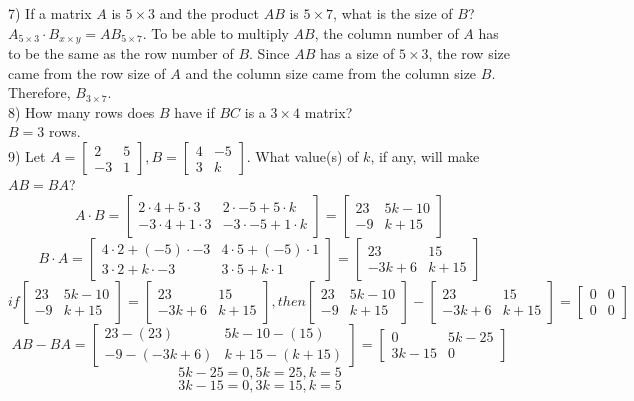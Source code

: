 \documentclass[a4paper]{article}
\begin{document}
7) If a matrix $A$ is $5\times3$ and the product $AB$ is $5\times7$, what is the size of $B$?\\
$A_{5\times3} \cdot B_{x \times y}=AB_{5\times7}$. To be able to multiply $AB$, the column number of $A$ has to be the same as the row number of $B$. Since $AB$ has a size of $5\times3$, the row size came from the row size of $A$ and the column size came from the column size $B$. Therefore, $B_{3\times7}$.\\

8) How many rows does $B$ have if $BC$ is a $3\times4$ matrix?\\
$B = 3$ rows.\\

9) Let $A = \begin{bmatrix}
2&5\\
-3&1
\end{bmatrix}, B = \begin{bmatrix}
4&-5\\
3&k
\end{bmatrix}$. What value(s) of $k$, if any, will make $AB = BA$?\\

\[A \cdot B=
\begin{bmatrix}
2\cdot4+5\cdot3&2\cdot-5+5\cdot k\\
-3\cdot4+1\cdot3&-3\cdot-5+1\cdot k
\end{bmatrix}=
\begin{bmatrix}
23&5k-10\\
-9&k+15
\end{bmatrix}
\]
\[B \cdot A=
\begin{bmatrix}
4\cdot2+(-5)\cdot-3&4\cdot5+(-5)\cdot1\\
3\cdot2+k\cdot-3&3\cdot5+k\cdot1
\end{bmatrix}=
\begin{bmatrix}
23&15\\
-3k+6&k+15
\end{bmatrix}
\]
\[if
\begin{bmatrix}
23&5k-10\\
-9&k+15
\end{bmatrix}=
\begin{bmatrix}
23&15\\
-3k+6&k+15
\end{bmatrix}, then
\begin{bmatrix}
23&5k-10\\
-9&k+15
\end{bmatrix} -
\begin{bmatrix}
23&15\\
-3k+6&k+15
\end{bmatrix} =
\begin{bmatrix}
0&0\\
0&0
\end{bmatrix}
\]
\[AB - BA =
\begin{bmatrix}
23-(23)&5k-10-(15)\\
-9-(-3k+6)&k+15-(k+15)
\end{bmatrix}=
\begin{bmatrix}
0&5k-25\\
3k-15&0
\end{bmatrix}
\]
$$5k-25=0, 5k=25, k=5$$
$$3k-15=0, 3k=15, k=5$$\\
\end{document}
